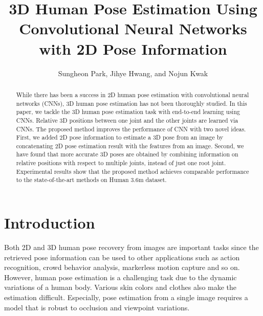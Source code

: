\documentclass[runningheads]{llncs}
\begin{document}
\pagestyle{headings}
\mainmatter

\title{3D Human Pose Estimation Using Convolutional Neural Networks with 2D Pose Information} 


\author{Sungheon Park, Jihye Hwang, and Nojun Kwak}




\maketitle


\begin{abstract}
While there has been a success in 2D human pose estimation with convolutional neural networks (CNNs), 3D human pose estimation has not been thoroughly studied. In this paper, we tackle the 3D human pose estimation task with end-to-end learning using CNNs. Relative 3D positions between one joint and the other joints are learned via CNNs. The proposed method improves the performance of CNN with two novel ideas. First, we added 2D pose information to estimate a 3D pose from an image by concatenating 2D pose estimation result with the features from an image. Second, we have found that more accurate 3D poses are obtained by combining information on relative positions with respect to multiple joints, instead of just one root joint. Experimental results show that the proposed method achieves comparable performance to the state-of-the-art methods on Human 3.6m dataset.
\end{abstract}

\section{Introduction}
Both 2D and 3D human pose recovery from images are important tasks since the retrieved pose information can be used to other applications such as action recognition, crowd behavior analysis, markerless motion capture and so on. However, human pose estimation is a challenging task due to the dynamic variations of a human body. Various skin colors and clothes also make the estimation difficult. Especially, pose estimation from a single image requires a model that is robust to occlusion and viewpoint variations.
\end{document}
